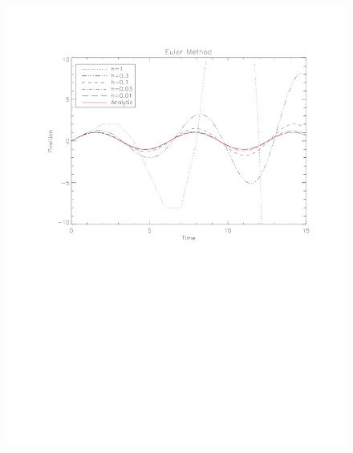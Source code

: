 \documentclass[11pt]{article}
\begin{document}
\graphicspath{{./Figures/}}
\begin{figure}[htb]
\centering
\includegraphics[scale = 0.75]{Euler.pdf}
\caption{}
\end{figure}
\end{document}
